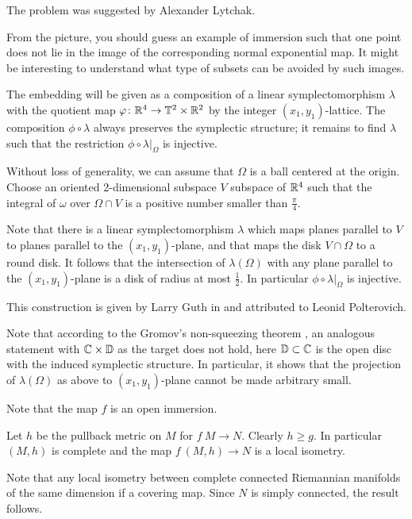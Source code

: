 The problem was suggested by Alexander Lytchak.

From the picture, you should guess an example of immersion 
such that one point does not lie in the image of the corresponding normal exponential map.
It might be interesting to understand what type of subsets can be avoided by such images.



The embedding will be given as a composition of a linear symplectomorphism $\lambda$ 
with the quotient map $\varphi\colon\mathbb{R}^4\to \mathbb{T}^2\times\mathbb{R}^2$ by the integer $(x_1,y_1)$-lattice.
The composition $\phi\circ\lambda$ always preserves the symplectic structure;
it remains to find $\lambda$ such that the restriction $\phi\circ\lambda|_\Omega$
is injective.

Without loss of generality,
we can assume that $\Omega$ is a ball centered at the origin.
Choose an oriented 2-dimensional subspace $V$ subspace of $\mathbb{R}^4$ 
such that the integral of $\omega$ over 
$\Omega\cap V$ is a  positive number smaller than $\tfrac\pi4$. 

Note that there is a linear symplectomorphism $\lambda$
 which maps planes parallel to $V$ to planes
parallel to the $(x_1,y_1)$-plane, 
and that maps the disk $V\cap\Omega$ to a round disk.
It follows that the intersection of $\lambda(\Omega)$ 
with any plane parallel to the $(x_1,y_1)$-plane is a disk of radius at most $\tfrac 12$.
In particular $\phi\circ\lambda|_\Omega$
is injective.\qeds

This construction is given 
by Larry Guth in \cite{guth-symplectic}
and attributed to Leonid Polterovich.

Note that according to the Gromov's non-squeezing theorem \cite[see][]{gromov-pseudoholomorphic}, 
an analogous statement with $\mathbb{C}\times \mathbb{D}$ as the target does not hold, here $\mathbb{D}\subset \mathbb{C}$ is the open disc with the induced symplectic structure.
In particular, it shows that
the projection of $\lambda(\Omega)$ as above 
to $(x_1,y_1)$-plane
cannot be made arbitrary small.

Note that the map $f$ is an open immersion.

Let $h$ be the pullback metric on $M$ for $f\:M\to N$.
Clearly $h\ge g$.
In particular $(M,h)$ is complete and the map $f\:(M,h)\to N$ is a local isometry. 

Note that any local isometry between complete connected Riemannian manifolds of the same dimension if a covering map.
Since $N$ is simply connected, the result follows.
\qeds 

